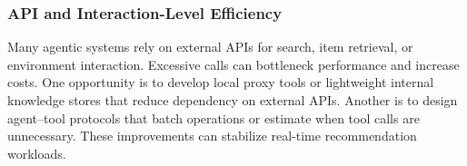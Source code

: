 \subsubsection{API and Interaction-Level Efficiency}
Many agentic systems rely on external APIs for search, item retrieval, or environment interaction. Excessive calls can bottleneck performance and increase costs.
One opportunity is to develop local proxy tools or lightweight internal knowledge stores that reduce dependency on external APIs. Another is to design agent–tool protocols that batch operations or estimate when tool calls are unnecessary. These improvements can stabilize real-time recommendation workloads.